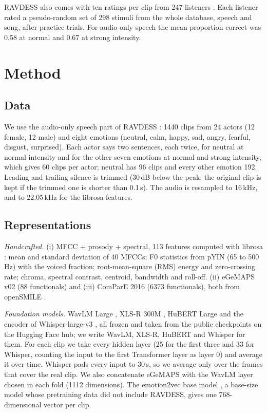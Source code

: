 \documentclass[journal]{IEEEtran}
\begin{document}
RAVDESS also comes with ten ratings per clip from 247 listeners \cite{livingstone2018ravdess}. Each listener rated a pseudo-random set of 298 stimuli from the whole database, speech and song, after practice trials. For audio-only speech the mean proportion correct was 0.58 at normal and 0.67 at strong intensity.



\section{Method}
\label{sec:method}

\subsection{Data}
We use the audio-only speech part of RAVDESS \cite{livingstone2018ravdess}: 1440 clips from 24 actors (12 female, 12 male) and eight emotions (neutral, calm, happy, sad, angry, fearful, disgust, surprised). Each actor says two sentences, each twice, for neutral at normal intensity and for the other seven emotions at normal and strong intensity, which gives 60 clips per actor; neutral has 96 clips and every other emotion 192. Leading and trailing silence is trimmed (30\,dB below the peak; the original clip is kept if the trimmed one is shorter than 0.1\,s). The audio is resampled to 16\,kHz, and to 22.05\,kHz for the librosa features.

\subsection{Representations}
\emph{Handcrafted.} (i) MFCC + prosody + spectral, 113 features computed with librosa \cite{mcfee2015librosa}: mean and standard deviation of 40 MFCCs; F0 statistics from pYIN \cite{mauch2014pyin} (65 to 500\,Hz) with the voiced fraction; root-mean-square (RMS) energy and zero-crossing rate; chroma, spectral contrast, centroid, bandwidth and roll-off. (ii) eGeMAPS v02 (88 functionals) and (iii) ComParE 2016 (6373 functionals), both from openSMILE \cite{eyben2010opensmile}.

\emph{Foundation models.} WavLM Large \cite{chen2022wavlm}, XLS-R 300M \cite{babu2022xlsr}, HuBERT Large \cite{hsu2021hubert} and the encoder of Whisper-large-v3 \cite{radford2023whisper}, all frozen and taken from the public checkpoints on the Hugging Face hub; we write WavLM, XLS-R, HuBERT and Whisper for them. For each clip we take every hidden layer (25 for the first three and 33 for Whisper, counting the input to the first Transformer layer as layer 0) and average it over time. Whisper pads every input to 30\,s, so we average only over the frames that cover the real clip. We also concatenate eGeMAPS with the WavLM layer chosen in each fold (1112 dimensions). The emotion2vec base model \cite{ma2024emotion2vec}, a base-size model whose pretraining data did not include RAVDESS, gives one 768-dimensional vector per clip.
\end{document}
